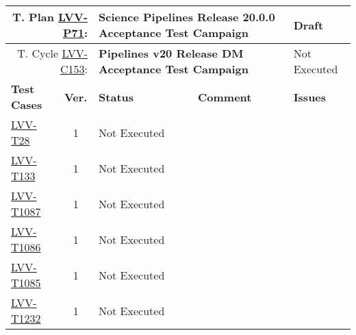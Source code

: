 \documentclass[DM,lsstdraft,STR,toc]{lsstdoc}
\begin{document}
{\small
\begin{longtable}{p{2cm}cp{2.3cm}p{8.6cm}p{2.3cm}}
\toprule
\multicolumn{2}{r}{ T. Plan \href{https://jira.lsstcorp.org/secure/Tests.jspa\#/testPlan/LVV-P71}{LVV-P71}:} &
\multicolumn{2}{p{10.9cm}}{\textbf{ Science Pipelines Release 20.0.0 Acceptance Test Campaign }} & Draft \\\hline
\multicolumn{2}{r}{ T. Cycle \href{https://jira.lsstcorp.org/secure/Tests.jspa\#/testCycle/LVV-C153}{LVV-C153}:} &
\multicolumn{2}{p{10.9cm}}{\textbf{ Pipelines v20 Release DM Acceptance Test Campaign }} & Not Executed \\\hline
\textbf{Test Cases} &  \textbf{Ver.} & \textbf{Status} & \textbf{Comment} & \textbf{Issues} \\\toprule
\href{https://jira.lsstcorp.org/secure/Tests.jspa#/testCase/LVV-T28}{LVV-T28}
&  1
& Not Executed &
\begin{minipage}[]{9cm}
\smallskip

\medskip
\end{minipage}
&
\\\hline
\href{https://jira.lsstcorp.org/secure/Tests.jspa#/testCase/LVV-T133}{LVV-T133}
&  1
& Not Executed &
\begin{minipage}[]{9cm}
\smallskip

\medskip
\end{minipage}
&
\\\hline
\href{https://jira.lsstcorp.org/secure/Tests.jspa#/testCase/LVV-T1087}{LVV-T1087}
&  1
& Not Executed &
\begin{minipage}[]{9cm}
\smallskip

\medskip
\end{minipage}
&
\\\hline
\href{https://jira.lsstcorp.org/secure/Tests.jspa#/testCase/LVV-T1086}{LVV-T1086}
&  1
& Not Executed &
\begin{minipage}[]{9cm}
\smallskip

\medskip
\end{minipage}
&
\\\hline
\href{https://jira.lsstcorp.org/secure/Tests.jspa#/testCase/LVV-T1085}{LVV-T1085}
&  1
& Not Executed &
\begin{minipage}[]{9cm}
\smallskip

\medskip
\end{minipage}
&
\\\hline
\href{https://jira.lsstcorp.org/secure/Tests.jspa#/testCase/LVV-T1232}{LVV-T1232}
&  1
& Not Executed &
\begin{minipage}[]{9cm}
\smallskip


\end{minipage}
\end{longtable}}
\end{document}
